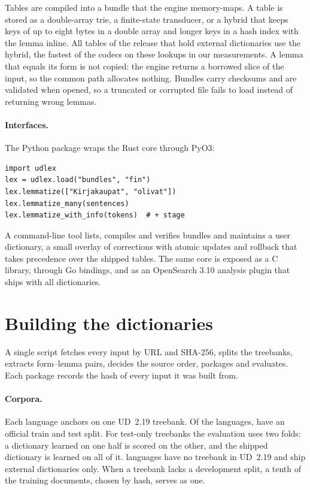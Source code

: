 \documentclass[11pt]{article}
\begin{document}
Tables are compiled into a bundle that the engine memory-maps. A table is
stored as a double-array trie, a finite-state transducer, or a hybrid that
keeps keys of up to eight bytes in a double array and longer keys in a hash
index with the lemma inline. All tables of the release that hold external
dictionaries use the hybrid, the fastest of the codecs on these lookups in
our measurements. A lemma that equals
its form is not copied: the engine returns a borrowed slice of the input, so
the common path allocates nothing. Bundles carry checksums and are validated
when opened, so a truncated or corrupted file fails to load instead of
returning wrong lemmas.

\paragraph{Interfaces.} The Python package wraps the Rust core through PyO3:
{\small
\begin{verbatim}
import udlex
lex = udlex.load("bundles", "fin")
lex.lemmatize(["Kirjakaupat", "olivat"])
lex.lemmatize_many(sentences)
lex.lemmatize_with_info(tokens)  # + stage
\end{verbatim}
}
A command-line tool lists, compiles and verifies bundles and maintains a
user dictionary, a small overlay of corrections with atomic updates and
rollback that takes precedence over the shipped tables. The same core is
exposed as a C library, through Go bindings, and as an OpenSearch 3.10
analysis plugin that ships with all \relLangs{} dictionaries.

\section{Building the dictionaries}
\label{sec:dictionaries}

A single script fetches every input by URL and SHA-256, splits the treebanks,
extracts form--lemma pairs, decides the source order, packages and evaluates.
Each package records the hash of every input it was built from.

\paragraph{Corpora.} Each language anchors on one UD~2.19 treebank. Of the
\relLangs{} languages, \accOffN{} have an official train and test split. For
\accTwoN{} test-only treebanks the evaluation uses two folds: a dictionary
learned on one half is scored on the other, and the shipped dictionary is
learned on all of it. \relNoCorpus{} languages have no treebank in UD~2.19 and
ship external dictionaries only. When a treebank lacks a development split, a
tenth of the training documents, chosen by hash, serves as one.
\end{document}
